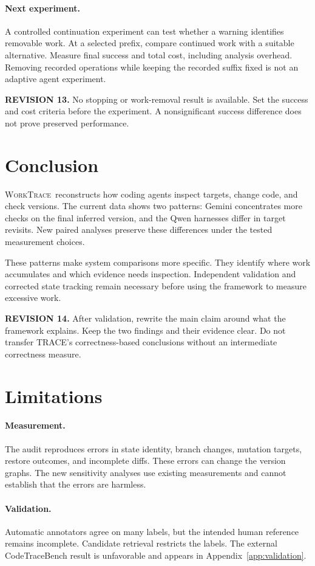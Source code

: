 \documentclass[10pt,a4paper,twocolumn]{article}
\newcommand{\rev}[2]{\par\smallskip\noindent\begin{minipage}{\linewidth}\color{revision}\footnotesize\textbf{REVISION #1.} #2\end{minipage}\par\smallskip}
\newcommand{\wt}{\textsc{WorkTrace}}
\begin{document}
\paragraph{Next experiment.}
A controlled continuation experiment can test whether a warning identifies removable work. At a selected prefix, compare continued work with a suitable alternative. Measure final success and total cost, including analysis overhead. Removing recorded operations while keeping the recorded suffix fixed is not an adaptive agent experiment.
\rev{13}{No stopping or work-removal result is available. Set the success and cost criteria before the experiment. A nonsignificant success difference does not prove preserved performance.}

\section{Conclusion}
\wt\ reconstructs how coding agents inspect targets, change code, and check versions. The current data shows two patterns: Gemini concentrates more checks on the final inferred version, and the Qwen harnesses differ in target revisits. New paired analyses preserve these differences under the tested measurement choices.

These patterns make system comparisons more specific. They identify where work accumulates and which evidence needs inspection. Independent validation and corrected state tracking remain necessary before using the framework to measure excessive work.
\rev{14}{After validation, rewrite the main claim around what the framework explains. Keep the two findings and their evidence clear. Do not transfer TRACE's correctness-based conclusions without an intermediate correctness measure.}

\section*{Limitations}
\paragraph{Measurement.}
The audit reproduces errors in state identity, branch changes, mutation targets, restore outcomes, and incomplete diffs. These errors can change the version graphs. The new sensitivity analyses use existing measurements and cannot establish that the errors are harmless.
\paragraph{Validation.}
Automatic annotators agree on many labels, but the intended human reference remains incomplete. Candidate retrieval restricts the labels. The external CodeTraceBench result is unfavorable and appears in Appendix~\ref{app:validation}.
\end{document}
